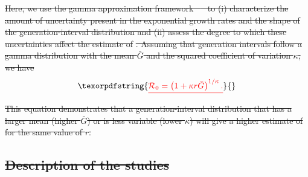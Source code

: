 \documentclass[12pt]{article}
\newcommand{\Ro}{\ensuremath{{\mathcal R}_{0}}\xspace}
\providecommand{\DIFdeltex}[1]{{\protect\color{red}\sout{#1}}}                      %
\providecommand{\DIFdel}[1]{\texorpdfstring{\DIFdeltex{#1}}{}} %
\begin{document}
\DIFdel{Here, we use the gamma approximation framework \mbox{%
\citep{mcbryde2009early, nishiura2009transmission, roberts2011early, park2019practical} }\hspace{0pt}%
to (i) characterize the amount of uncertainty present in the exponential growth rates and the shape of the generation-interval distribution and (ii) assess the degree to which these uncertainties affect the estimate of }%
\DIFdel{.
Assuming that generation intervals follow a gamma distribution
with the mean $\bar G$ and the squared coefficient of variation $\kappa$, 
we have
}%
\begin{displaymath}
\DIFdel{\Ro = \left(1 + \kappa r \bar{G}\right)^{1/\kappa}.
}\end{displaymath}%
\DIFdel{This equation demonstrates that a generation-interval distribution
that has a larger mean (higher $\bar{G}$) or is less variable (lower $\kappa$)
will give a higher estimate of }%
\DIFdel{for the same value of $r$.
}%

\subsection{\DIFdel{Description of the studies}}
\addtocounter{subsection}{-1}%
\end{document}
